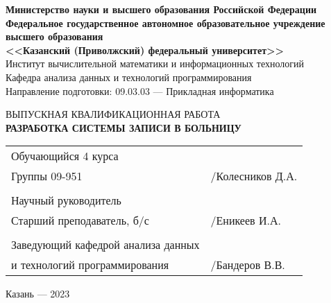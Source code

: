 \documentclass[a4paper]{article}
\begin{document}
    \begin{titlepage}
        \begin{center}
            {\bfseries Министерство науки и высшего образования Российской Федерации \\
            Федеральное государственное автономное образовательное учреждение \\
            высшего образования \\
            <<Казанский (Приволжский) федеральный университет>>} \\
            Институт вычислительной математики и информационных технологий \\
            Кафедра анализа данных и технологий программирования \\
            \vspace{1cm}
            Направление подготовки: 09.03.03 — Прикладная информатика
        \end{center}

        \vspace{3cm}

        \begin{center}
            ВЫПУСКНАЯ КВАЛИФИКАЦИОННАЯ РАБОТА \\
            {\bfseries РАЗРАБОТКА СИСТЕМЫ ЗАПИСИ В БОЛЬНИЦУ}
        \end{center}

        \vfill

        \begin{xltabular}{\textwidth} {
                >{\hsize} X
                >{\hsize} X }
            Обучающийся 4 курса &\\
            Группы 09-951 & \underline{\hspace{3cm}}/Колесников Д.А. \\
            & \\
            Научный руководитель & \\
            Старший преподаватель, б/с & \underline{\hspace{3cm}}/Еникеев И.А. \\
            & \\
            Заведующий кафедрой анализа данных & \\
            и технологий программирования & \underline{\hspace{3cm}}/Бандеров В.В. \\
        \end{xltabular}

        \vspace{1cm}

        \begin{center}
            Казань — 2023
        \end{center}
    \end{titlepage}
\end{document}
